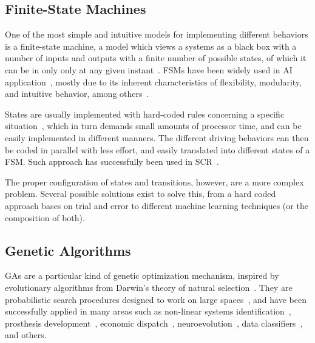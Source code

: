 


\subsection{Finite-State Machines}%
One of the most simple and intuitive models for implementing different behaviors is a finite-state machine, a model which views a systems as a black box with a number of inputs and outputs with a finite number of possible states, of which it can be in only only at any given instant~\cite{belzer_encyclopedia_1992}. FSMs have been widely used in AI application~\cite{Millington:2006:FSM}, mostly due to its inherent characteristics of flexibility, modularity, and intuitive behavior, among others~\cite{Buckland:2005:AI}.

States are usually implemented with hard-coded rules concerning a specific situation~\cite{Buckland:2005:AI}, which in turn demands small amounts of processor time, and can be easily implemented in different manners. The different driving behaviors can then be coded in parallel with less effort, and easily translated into different states of a FSM. Such approach has successfully been used in SCR~\cite{2009,DIEGO}.

The proper configuration of states and transitions, however, are a more complex problem. Several possible solutions exist to solve this, from a hard coded approach bases on trial and error to different machine learning techniques (or the composition of both).






\subsection{Genetic Algorithms}
GAs are a particular kind of genetic optimization mechanism, inspired by evolutionary algorithms from Darwin's theory of natural selection~\cite{GA}. They are probabilistic search procedures designed to work on large spaces~\cite{goldberg1988}, and have been successfully applied in many areas such as non-linear systems identification~\cite{GACTRL}, prosthesis development~\cite{GABIO}, economic dispatch~\cite{GAECO}, neuroevolution~\cite{stanley_real-time_2005}, data classifiers~\cite{pedrycz_genetic_2005}, and others.

